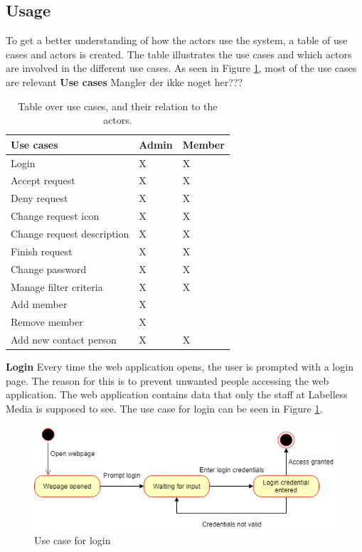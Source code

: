 \subsection{Usage}
To get a better understanding of how the actors use the system, a table of use cases and actors is created.
The table illustrates the use cases and which actors are involved in the different use cases.
As seen in Figure \ref{tab:useCaseTable}, most of the use cases are relevant 
\newline \newline \noindent
\textbf{Use cases}\newline
Mangler der ikke noget her???
\begin{table}[]
\begin{tabular}{|l|l|l|}
\hline
\textbf{Use cases}                  & Admin & Member \\ \hline
Login                      & X     & X     \\ \hline
Accept request             & X     & X      \\ \hline
Deny request               & X     & X      \\ \hline
Change request icon        & X     & X      \\ \hline
Change request description & X     & X      \\ \hline
Finish request             & X     & X      \\ \hline
Change password            & X     & X      \\ \hline
Manage filter criteria     & X     & X      \\ \hline
Add member                 & X     &       \\ \hline
Remove member              & X     &       \\ \hline
Add new contact person     & X     & X      \\ \hline
\end{tabular}
\caption{Table over use cases, and their relation to the actors.}
\label{tab:useCaseTable}
\end{table}
\newpage
\noindent
\textbf{Login}\newline
Every time the web application opens, the user is prompted with a login page. The reason for this is to prevent unwanted people accessing the web application. The web application contains data that only the staff at Labelless Media is supposed to see. The use case for login can be seen in Figure \ref{fig:useCaseLogin}.
\begin{figure}[H]
    \centering
    \includegraphics[scale=0.6, clip]{figures/useCaseLogin.png}
    \caption{Use case for login }
    \label{fig:useCaseLogin}
\end{figure}
